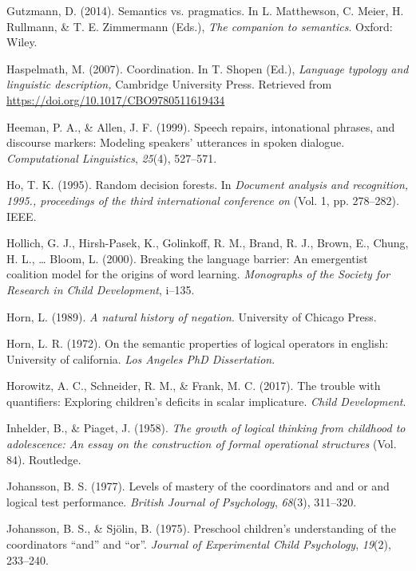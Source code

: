 \documentclass[oneside]{report}
\theoremstyle{definition}
\theoremstyle{definition}
\theoremstyle{definition}
\theoremstyle{remark}
\begin{document}
\hypertarget{ref-gutzmann2014}{}
Gutzmann, D. (2014). Semantics vs. pragmatics. In L. Matthewson, C.
Meier, H. Rullmann, \& T. E. Zimmermann (Eds.), \emph{The companion to
semantics}. Oxford: Wiley.

\hypertarget{ref-haspelmath2007}{}
Haspelmath, M. (2007). Coordination. In T. Shopen (Ed.), \emph{Language
typology and linguistic description,} Cambridge University Press.
Retrieved from \url{https://doi.org/10.1017/CBO9780511619434}

\hypertarget{ref-heeman1999speech}{}
Heeman, P. A., \& Allen, J. F. (1999). Speech repairs, intonational
phrases, and discourse markers: Modeling speakers' utterances in spoken
dialogue. \emph{Computational Linguistics}, \emph{25}(4), 527--571.

\hypertarget{ref-ho1995random}{}
Ho, T. K. (1995). Random decision forests. In \emph{Document analysis
and recognition, 1995., proceedings of the third international
conference on} (Vol. 1, pp. 278--282). IEEE.

\hypertarget{ref-hollich2000breaking}{}
Hollich, G. J., Hirsh-Pasek, K., Golinkoff, R. M., Brand, R. J., Brown,
E., Chung, H. L., \ldots{} Bloom, L. (2000). Breaking the language
barrier: An emergentist coalition model for the origins of word
learning. \emph{Monographs of the Society for Research in Child
Development}, i--135.

\hypertarget{ref-horn1989natural}{}
Horn, L. (1989). \emph{A natural history of negation}. University of
Chicago Press.

\hypertarget{ref-horn1972semantic}{}
Horn, L. R. (1972). On the semantic properties of logical operators in
english: University of california. \emph{Los Angeles PhD Dissertation}.

\hypertarget{ref-horowitz2017trouble}{}
Horowitz, A. C., Schneider, R. M., \& Frank, M. C. (2017). The trouble
with quantifiers: Exploring children's deficits in scalar implicature.
\emph{Child Development}.

\hypertarget{ref-piaget1958growth}{}
Inhelder, B., \& Piaget, J. (1958). \emph{The growth of logical thinking
from childhood to adolescence: An essay on the construction of formal
operational structures} (Vol. 84). Routledge.

\hypertarget{ref-johansson1977levels}{}
Johansson, B. S. (1977). Levels of mastery of the coordinators and and
or and logical test performance. \emph{British Journal of Psychology},
\emph{68}(3), 311--320.

\hypertarget{ref-johansson1975preschool}{}
Johansson, B. S., \& Sjölin, B. (1975). Preschool children's
understanding of the coordinators ``and'' and ``or''. \emph{Journal of
Experimental Child Psychology}, \emph{19}(2), 233--240.
\end{document}
